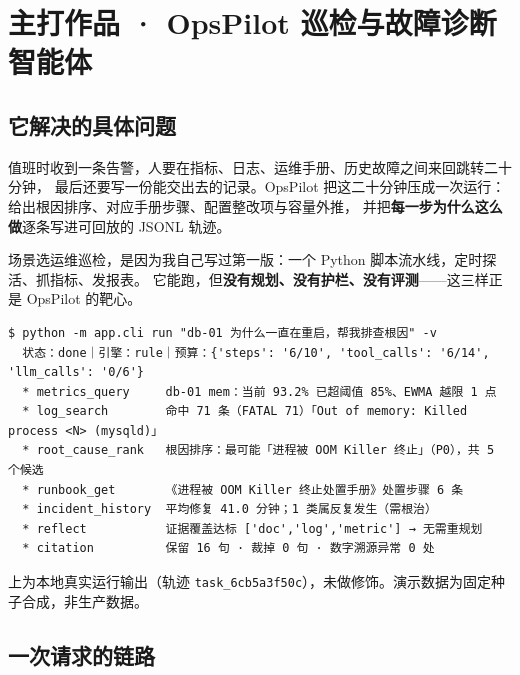 \documentclass[10.5pt,a4paper]{article}
\begin{document}
\setcounter{page}{1}
\section{主打作品 · OpsPilot 巡检与故障诊断智能体}

\subsection{它解决的具体问题}

值班时收到一条告警，人要在指标、日志、运维手册、历史故障之间来回跳转二十分钟，
最后还要写一份能交出去的记录。OpsPilot 把这二十分钟压成一次运行：
给出根因排序、对应手册步骤、配置整改项与容量外推，
并把\textbf{每一步为什么这么做}逐条写进可回放的 JSONL 轨迹。

场景选运维巡检，是因为我自己写过第一版：一个 Python 脚本流水线，定时探活、抓指标、发报表。
它能跑，但\textbf{没有规划、没有护栏、没有评测}——这三样正是 OpsPilot 的靶心。

\begin{lstlisting}[style=sh]
$ python -m app.cli run "db-01 为什么一直在重启，帮我排查根因" -v
  状态：done｜引擎：rule｜预算：{'steps': '6/10', 'tool_calls': '6/14', 'llm_calls': '0/6'}
  * metrics_query     db-01 mem：当前 93.2% 已超阈值 85%、EWMA 越限 1 点
  * log_search        命中 71 条（FATAL 71）「Out of memory: Killed process <N> (mysqld)」
  * root_cause_rank   根因排序：最可能「进程被 OOM Killer 终止」（P0），共 5 个候选
  * runbook_get       《进程被 OOM Killer 终止处置手册》处置步骤 6 条
  * incident_history  平均修复 41.0 分钟；1 类属反复发生（需根治）
  * reflect           证据覆盖达标 ['doc','log','metric'] → 无需重规划
  * citation          保留 16 句 · 裁掉 0 句 · 数字溯源异常 0 处
\end{lstlisting}
{\footnotesize\color{dim}上为本地真实运行输出（轨迹 \texttt{task\_6cb5a3f50c}），未做修饰。演示数据为固定种子合成，非生产数据。\par}

\subsection{一次请求的链路}
\end{document}
